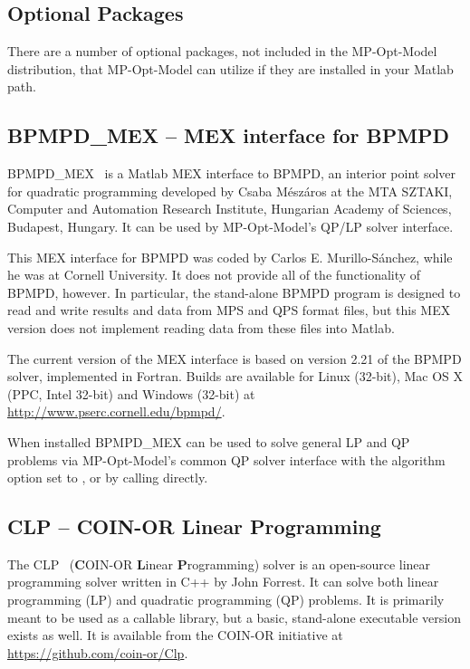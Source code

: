 \documentclass[12pt]{article}
\newcommand{\matlab}[0]{{\sc Matlab}}
\newcommand{\mpom}[0]{\mbox{MP-Opt-Model}}
\newcommand{\clp}[0]{{CLP}}
\newcommand{\code}[1]{{\relsize{-0.5}{\tt{{#1}}}}}  %
\newcommand{\codeq}[1]{\code{\textquotesingle{}#1\textquotesingle}}  %
\numberwithin{equation}{section}
\numberwithin{table}{section}
\numberwithin{figure}{section}
\begin{document}
\begin{appendices}
\clearpage
\section{Optional Packages}
\label{app:optional_packages}

There are a number of optional packages, not included in the \mpom{} distribution, that \mpom{} can utilize if they are installed in your \matlab{} path.

\subsection{BPMPD\_MEX -- MEX interface for BPMPD}
\label{app:bpmpd}

BPMPD\_MEX~\cite{bpmpdmex,meszaros1996} is a \matlab{} MEX interface to BPMPD, an interior point solver for quadratic programming developed by Csaba M{\'e}sz{\'a}ros at the MTA SZTAKI, Computer and Automation Research Institute, Hungarian Academy of Sciences, Budapest, Hungary. It can be used by \mpom{}'s QP/LP solver interface.

This MEX interface for BPMPD was coded by Carlos E. Murillo-S{\'a}nchez, while he was at Cornell University. It does not provide all of the functionality of BPMPD, however. In particular, the stand-alone BPMPD program is designed to read and write results and data from MPS and QPS format files, but this MEX version does not implement reading data from these files into \matlab{}.

The current version of the MEX interface is based on version 2.21 of the BPMPD solver, implemented in Fortran. Builds are available for Linux (32-bit), Mac OS X (PPC, Intel 32-bit) and Windows (32-bit) at \url{http://www.pserc.cornell.edu/bpmpd/}.

When installed BPMPD\_MEX can be used to solve general LP and QP problems via \mpom{}'s common QP solver interface \code{qps\_master} with the algorithm option set to \codeq{BPMPD}, or by calling \code{qps\_bpmpd} directly.

\subsection{\clp{} -- COIN-OR Linear Programming}
\label{app:clp}

The \clp{}~\cite{clp} ({\bf C}OIN-OR {\bf L}inear {\bf P}rogramming) solver is an open-source linear programming solver written in C++ by John Forrest. It can solve both linear programming (LP) and quadratic programming (QP) problems. It is primarily meant to be used as a callable library, but a basic, stand-alone executable version exists as well. It is available from the COIN-OR initiative at \url{https://github.com/coin-or/Clp}.


\end{appendices}
\end{document}

